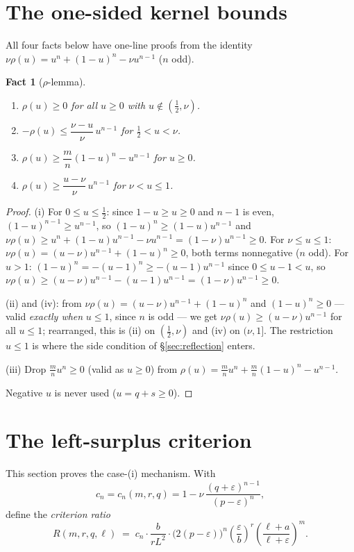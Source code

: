 \documentclass[11pt]{amsart}
\newtheorem{fact}[theorem]{Fact}
\theoremstyle{remark}
\begin{document}
\section{The one-sided kernel bounds}\label{sec:rho}

All four facts below have one-line proofs from the identity $\nu\rho(u)=u^n+(1-u)^n-\nu u^{n-1}$ ($n$ odd).

\begin{fact}[$\rho$-lemma]\label{fact:rho}
\begin{enumerate}[label=\textup{(\roman*)}]
\item $\rho(u)\ge0$ for all $u\ge0$ with $u\notin(\tfrac12,\nu)$.
\item $-\rho(u)\le\dfrac{\nu-u}{\nu}\,u^{n-1}$ for $\tfrac12<u<\nu$.
\item $\rho(u)\ge\dfrac mn(1-u)^n-u^{n-1}$ for $u\ge0$.
\item $\rho(u)\ge\dfrac{u-\nu}{\nu}\,u^{n-1}$ for $\nu<u\le1$.
\end{enumerate}
\end{fact}

\begin{proof}
(i) For $0\le u\le\tfrac12$: since $1-u\ge u\ge0$ and $n-1$ is even, $(1-u)^{n-1}\ge u^{n-1}$, so $(1-u)^n\ge(1-u)u^{n-1}$ and
$\nu\rho(u)\ge u^n+(1-u)u^{n-1}-\nu u^{n-1}=(1-\nu)u^{n-1}\ge0$.
For $\nu\le u\le1$: $\nu\rho(u)=(u-\nu)u^{n-1}+(1-u)^n\ge0$, both terms nonnegative ($n$ odd).
For $u>1$: $(1-u)^n=-(u-1)^n\ge-(u-1)u^{n-1}$ since $0\le u-1<u$, so $\nu\rho(u)\ge(u-\nu)u^{n-1}-(u-1)u^{n-1}=(1-\nu)u^{n-1}\ge0$.

(ii) and (iv): from $\nu\rho(u)=(u-\nu)u^{n-1}+(1-u)^n$ and $(1-u)^n\ge0$ --- valid \emph{exactly when} $u\le1$, since $n$ is odd --- we get $\nu\rho(u)\ge(u-\nu)u^{n-1}$ for all $u\le1$; rearranged, this is (ii) on $(\tfrac12,\nu)$ and (iv) on $(\nu,1]$.  The restriction $u\le1$ is where the side condition of \S\ref{sec:reflection} enters.

(iii) Drop $\tfrac mn u^n\ge0$ (valid as $u\ge0$) from $\rho(u)=\tfrac mn u^n+\tfrac mn(1-u)^n-u^{n-1}$.

Negative $u$ is never used ($u=q+s\ge0$).
\end{proof}

\section{The left-surplus criterion}\label{sec:leftsurplus}

This section proves the case-(i) mechanism.  With
\begin{equation}\label{eq:cn}
        c_n=c_n(m,r,q)=1-\nu\,\frac{(q+\varepsilon)^{n-1}}{(p-\varepsilon)^{n}},
\end{equation}
define the \emph{criterion ratio}
\begin{equation}\label{eq:R}
        R(m,r,q,\ell)
        \;=\;
        c_n\cdot\frac{b}{r L^{2}}\cdot
        \bigl(2(p-\varepsilon)\bigr)^{n}
        \left(\frac{\varepsilon}{b}\right)^{r}
        \left(\frac{\ell+a}{\ell+\varepsilon}\right)^{m}.
\end{equation}
\end{document}
